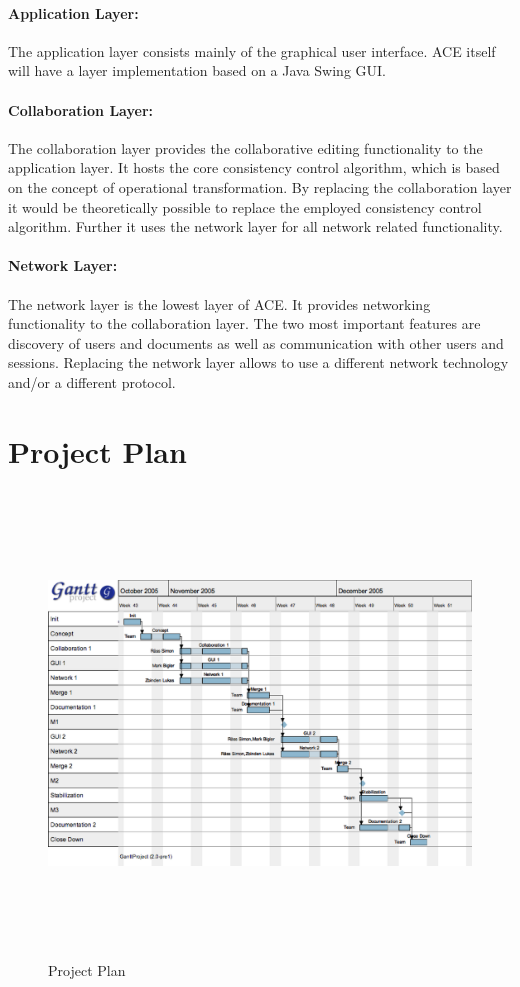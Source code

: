 \documentclass[11pt,a4paper]{article}
\begin{document}
\paragraph{Application Layer:} The application layer consists mainly of the graphical
user interface. ACE itself will have a layer implementation based on a Java Swing GUI.

\paragraph{Collaboration Layer:} The collaboration layer provides the collaborative
editing functionality to the application layer. It hosts the core consistency
control algorithm, which is based on the concept of operational transformation.
By replacing the collaboration layer it would be theoretically possible to replace
the employed consistency control algorithm. Further it uses the network layer
for all network related functionality.

\paragraph{Network Layer:} The network layer is the lowest layer of ACE. It provides
networking functionality to the collaboration layer. The two most important features
are discovery of users and documents as well as communication with other users and
sessions. Replacing the network layer allows to use a different network technology 
and/or a different protocol.


\section{Project Plan}

\begin{figure}[H]
 \centering
 \includegraphics[height=350pt,width=540pt,angle=90]{../images/projectmanagement/gantt.eps}
 \caption{Project Plan}
\end{figure}
\newpage
\end{document}
